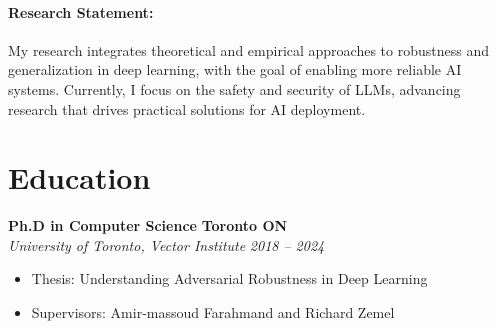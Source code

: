 \paragraph{Research Statement:}
My research integrates theoretical and empirical approaches to robustness and generalization in deep learning, with the goal of enabling more reliable AI systems. Currently, I focus on the safety and security of LLMs, advancing research that drives practical solutions for AI deployment.

\section*{Education}
\vspace{\postsubhead}
    \textbf{Ph.D in Computer Science}
    \hfill
    \textbf{Toronto ON}\\
    \textit{University of Toronto, Vector Institute}
    \hfill
    \textit{2018 -- 2024}
    \begin{itemize}
        \item Thesis: Understanding Adversarial Robustness in Deep Learning
        \item Supervisors: Amir-massoud Farahmand and Richard Zemel
    \end{itemize}
    \vspace{\interlist}
    
